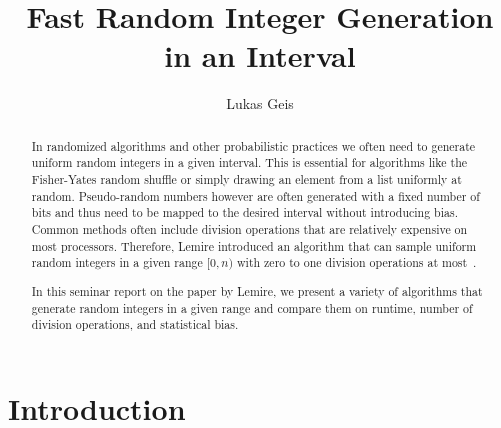 \documentclass[a4paper, UKenglish, cleveref, autoref, thm-restate]{lipics-v2021}
\title{Fast Random Integer Generation in an Interval}
\author{Lukas Geis}{Goethe Universität Frankfurt am Main}{s2949316@stud.uni-frankfurt.de}{}{}
\begin{document}
\maketitle


\begin{abstract}
    In randomized algorithms and other probabilistic practices we often need to generate uniform random integers in a given interval.
    This is essential for algorithms like the Fisher-Yates random shuffle or simply drawing an element from a list uniformly at random.
    Pseudo-random numbers however are often generated with a fixed number of bits and thus need to be mapped to the desired interval without introducing bias.
    Common methods often include division operations that are relatively expensive on most processors.
    Therefore, Lemire introduced an algorithm that can sample uniform random integers in a given range $[0,n)$ with zero to one division operations at most~\cite{Lemire}.

    In this seminar report on the paper by Lemire, we present a variety of algorithms that generate random integers in a given range and compare them on runtime, number of division operations, and statistical bias.
\end{abstract}


\section{Introduction}
\end{document}
